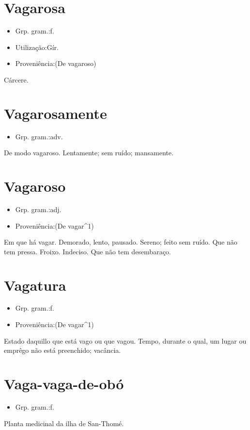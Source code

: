 \documentclass{article}
\begin{document}
\section{Vagarosa}
\begin{itemize}
\item {Grp. gram.:f.}
\end{itemize}
\begin{itemize}
\item {Utilização:Gír.}
\end{itemize}
\begin{itemize}
\item {Proveniência:(De \textunderscore vagaroso\textunderscore )}
\end{itemize}
Cárcere.
\section{Vagarosamente}
\begin{itemize}
\item {Grp. gram.:adv.}
\end{itemize}
De modo vagaroso.
Lentamente; sem ruído; mansamente.
\section{Vagaroso}
\begin{itemize}
\item {Grp. gram.:adj.}
\end{itemize}
\begin{itemize}
\item {Proveniência:(De \textunderscore vagar\textunderscore ^1)}
\end{itemize}
Em que há vagar.
Demorado, lento, pausado.
Sereno; feito sem ruído.
Que não tem pressa.
Froixo.
Indeciso.
Que não tem desembaraço.
\section{Vagatura}
\begin{itemize}
\item {Grp. gram.:f.}
\end{itemize}
\begin{itemize}
\item {Proveniência:(De \textunderscore vagar\textunderscore ^1)}
\end{itemize}
Estado daquillo que está vago ou que vagou.
Tempo, durante o qual, um lugar ou emprêgo não está preenchido; vacância.
\section{Vaga-vaga-de-obó}
\begin{itemize}
\item {Grp. gram.:f.}
\end{itemize}
Planta medicinal da ilha de San-Thomé.
\end{document}
